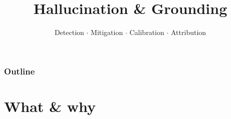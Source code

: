 \documentclass[aspectratio=169]{beamer}
\title{Hallucination \& Grounding}
\subtitle{Detection $\cdot$ Mitigation $\cdot$ Calibration $\cdot$ Attribution}
\date{}
\begin{document}
\begin{frame}
\titlepage
\end{frame}

\begin{frame}
\frametitle{Outline}
\tableofcontents
\end{frame}

\section{What \& why}
\end{document}
